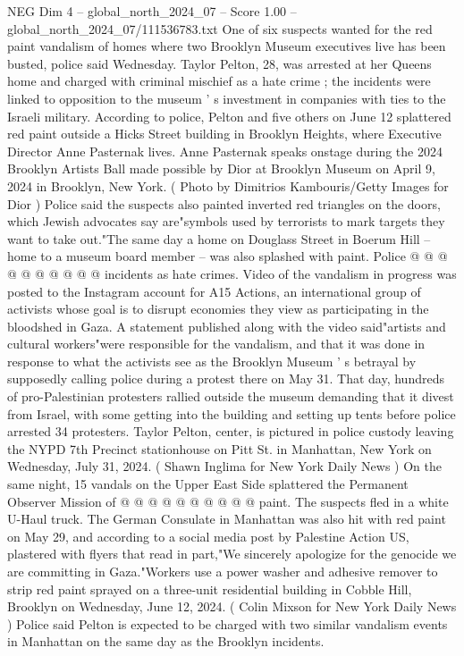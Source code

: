 \begin{textsample}{NEG Dim 4 – global\_north\_2024\_07 – Score 1.00 – global\_north\_2024\_07/111536783.txt}  \label{ex:f4_neg_264}
One of six suspects wanted for the red paint vandalism of homes where two Brooklyn Museum executives live has been busted, police said Wednesday.
Taylor Pelton, 28, was arrested at her Queens home and charged with criminal mischief as a hate crime ; the incidents were linked to opposition to the museum ' s investment in companies with ties to the Israeli military.
According to police, Pelton and five others on June 12 splattered red paint outside a Hicks Street building in Brooklyn Heights, where Executive Director Anne Pasternak lives.
Anne Pasternak speaks onstage during the 2024 Brooklyn Artists Ball made possible by Dior at Brooklyn Museum on April 9, 2024 in Brooklyn, New York. ( Photo by Dimitrios Kambouris/Getty Images for Dior ) Police said the suspects also painted inverted red triangles on the doors, which Jewish advocates say are"symbols used by terrorists to mark targets they want to take out."The same day a home on Douglass Street in Boerum Hill -- home to a museum board member -- was also splashed with paint.
Police @ @ @ @ @ @ @ @ @ @ incidents as hate crimes.
Video of the vandalism in progress was posted to the Instagram account for A15 Actions, an international group of activists whose goal is to disrupt economies they view as participating in the bloodshed in Gaza.
A statement published along with the video said"artists and cultural workers"were responsible for the vandalism, and that it was done in response to what the activists see as the Brooklyn Museum ' s betrayal by supposedly calling police during a protest there on May 31.
That day, hundreds of pro-Palestinian protesters rallied outside the museum demanding that it divest from Israel, with some getting into the building and setting up tents before police arrested 34 protesters.
Taylor Pelton, center, is pictured in police custody leaving the NYPD 7th Precinct stationhouse on Pitt St. in Manhattan, New York on Wednesday, July 31, 2024. ( Shawn Inglima for New York Daily News ) On the same night, 15 vandals on the Upper East Side splattered the Permanent Observer Mission of @ @ @ @ @ @ @ @ @ @ paint.
The suspects fled in a white U-Haul truck.
The German Consulate in Manhattan was also hit with red paint on May 29, and according to a social media post by Palestine Action US, plastered with flyers that read in part,"We sincerely apologize for the genocide we are committing in Gaza."Workers use a power washer and adhesive remover to strip red paint sprayed on a three-unit residential building in Cobble Hill, Brooklyn on Wednesday, June 12, 2024. ( Colin Mixson for New York Daily News ) Police said Pelton is expected to be charged with two similar vandalism events in Manhattan on the same day as the Brooklyn incidents.

\end{textsample}
